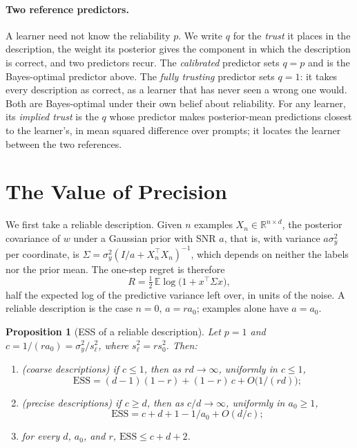 \documentclass[10pt]{article}
\newtheorem{proposition}{Proposition}
\newcommand{\ess}{\mathrm{ESS}}
\newcommand{\E}{\mathbb{E}}
\newcommand{\R}{\mathbb{R}}
\begin{document}
\paragraph{Two reference predictors.}
A learner need not know the reliability $p$. We write $q$ for the \emph{trust} it places in the description, the weight its posterior gives the component in which the description is correct, and two predictors recur. The \emph{calibrated} predictor sets $q = p$ and is the Bayes-optimal predictor above. The \emph{fully trusting} predictor sets $q = 1$: it takes every description as correct, as a learner that has never seen a wrong one would. Both are Bayes-optimal under their own belief about reliability. For any learner, its \emph{implied trust} is the $q$ whose predictor makes posterior-mean predictions closest to the learner's, in mean squared difference over prompts; it locates the learner between the two references.

\section{The Value of Precision}\label{sec:precision}

We first take a reliable description. Given $n$ examples $X_n \in \R^{n \times d}$, the posterior covariance of $w$ under a Gaussian prior with SNR $a$, that is, with variance $a\sigma_y^2$ per coordinate, is $\Sigma = \sigma_y^2 (I/a + X_n^\top X_n)^{-1}$, which depends on neither the labels nor the prior mean. The one-step regret is therefore
\begin{equation}\label{eq:gaussian-regret}
R = \tfrac12\, \E \log\big(1 + x^\top \Sigma x\big),
\end{equation}
half the expected log of the predictive variance left over, in units of the noise. A reliable description is the case $n = 0$, $a = r a_0$; examples alone have $a = a_0$.

\begin{proposition}[ESS of a reliable description]\label{prop:precision}
Let $p = 1$ and $c = 1/(r a_0) = \sigma_y^2/s_\ell^2$, where $s_\ell^2 = r s_0^2$. Then:
\begin{enumerate}
\item[(i)] \emph{(coarse descriptions)} if $c \le 1$, then as $rd \to \infty$, uniformly in $c \le 1$,
\[
\ess = (d-1)(1-r) + (1-r)\,c + O\big(1/(rd)\big);
\]
\item[(ii)] \emph{(precise descriptions)} if $c \ge d$, then as $c/d \to \infty$, uniformly in $a_0 \ge 1$,
\[
\ess = c + d + 1 - 1/a_0 + O(d/c);
\]
\item[(iii)] for every $d$, $a_0$, and $r$, $\ess \le c + d + 2$.
\end{enumerate}
\end{proposition}
\end{document}
